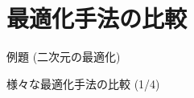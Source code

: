 \section{最適化手法の比較}

\begin{frame}[t,fragile]{例題 (二次元の最適化)}
  \begin{center}
  \end{center}
\end{frame}

\begin{frame}[t,fragile]{様々な最適化手法の比較 (1/4)}
  \begin{center}
  \end{center}
\end{frame}

